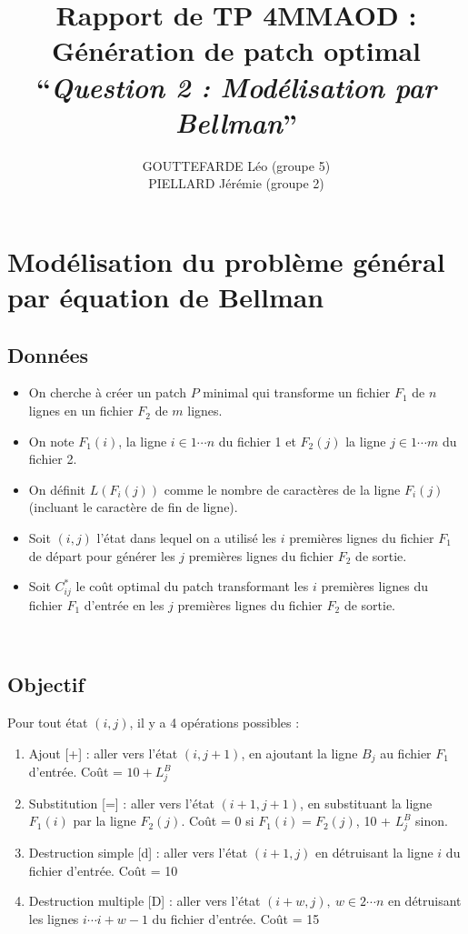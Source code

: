 \documentclass[a4paper, 10pt, french]{article}
\title{Rapport de TP 4MMAOD : Génération de patch optimal\\
``{\em Question 2 : Modélisation par Bellman}'' }
\author{
GOUTTEFARDE Léo (groupe 5)
\\ PIELLARD Jérémie (groupe 2)
}
\begin{document}
\maketitle

\section*{Modélisation du problème général par équation de Bellman}

\subsection*{Données}

\begin{itemize}
\item On cherche à créer un patch $P$ minimal qui transforme un fichier $F_1$ de $n$ lignes en un fichier $F_2$ de $m$ lignes.

\item On note $F_1(i)$, la ligne $i \in 1 \cdots n$ du fichier 1 et $F_2(j)$ la ligne $j \in 1 \cdots m$ du fichier 2.

\item On définit $L(F_i(j))$ comme le nombre de caractères de la ligne $F_i(j)$ (incluant le caractère de fin de ligne).


\item Soit $(i,j)$ l'état dans lequel on a utilisé les $i$ premières lignes du fichier $F_1$ de départ pour générer les $j$ premières lignes du fichier $F_2$ de sortie.

\item Soit $C^*_{ij}$ le coût optimal du patch transformant les $i$ premières lignes du fichier $F_1$ d'entrée en les $j$ premières lignes du fichier $F_2$ de sortie.
\end{itemize}
\hfill \\


\subsection*{Objectif}

Pour tout état $(i,j)$, il y a 4 opérations possibles :
\begin{enumerate}
\item Ajout [+] : aller vers l'état $(i,j+1)$, en ajoutant la ligne $B_j$ au fichier $F_1$ d'entrée. Coût = $10 + L_j^B$

\item Substitution [=] : aller vers l'état $(i+1,j+1)$, en substituant la ligne $F_1(i)$ par la ligne $F_2(j)$. Coût = 0 si $F_1(i) = F_2(j)$, 10 + $L_j^B$ sinon.

\item Destruction simple [d] : aller vers l'état $(i+1,j)$ en détruisant la ligne $i$ du fichier d'entrée. Coût = 10

\item Destruction multiple [D] : aller vers l'état $(i+w,j),\ w \in 2 \cdots n$ en détruisant les lignes $i \cdots i + w-1$ du fichier d'entrée. Coût = 15
\end{enumerate}
\hfill \\
\end{document}
